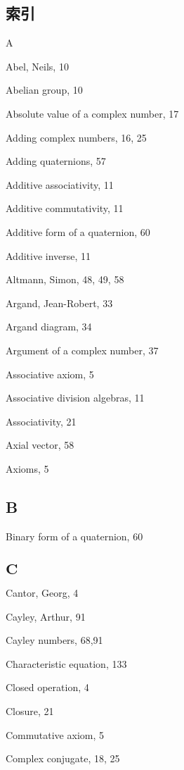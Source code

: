 
\begin{CJK}{UTF8}{gkai}
    \chapter*{索引}
  \end{CJK}
  
  A
  
  Abel, Neils, 10
  
  Abelian group, 10
  
  Absolute value of a complex number, 17
  
  Adding complex numbers, 16, 25
  
  Adding quaternions, 57
  
  Additive associativity, 11
  
  Additive commutativity, 11
  
  Additive form of a quaternion, 60
  
  Additive inverse, 11
  
  Altmann, Simon, 48, 49, 58
  
  Argand, Jean-Robert, 33
  
  Argand diagram, 34
  
  Argument of a complex number, 37
  
  Associative axiom, 5
  
  Associative division algebras, 11
  
  Associativity, 21
  
  Axial vector, 58
  
  Axioms, 5
  
  \section{B}
  Binary form of a quaternion, 60
  
  \section{$\mathbf{C}$}
  Cantor, Georg, 4
  
  Cayley, Arthur, 91
  
  Cayley numbers, 68,91
  
  Characteristic equation, 133
  
  Closed operation, 4
  
  Closure, 21
  
  Commutative axiom, 5
  
  Complex conjugate, 18, 25
  
